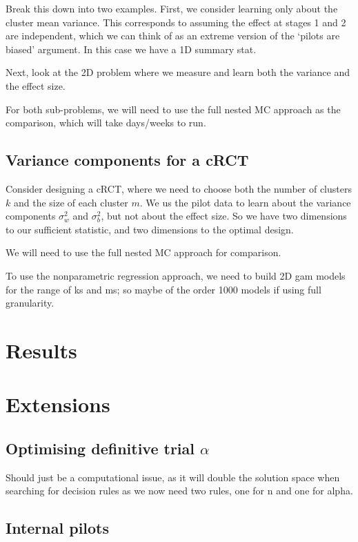 \documentclass[sagev, Crown]{sagej} %
\begin{document}
Break this down into two examples. First, we consider learning only about the cluster mean variance. This corresponds to assuming the effect at stages 1 and 2 are independent, which we can think of as an extreme version of the `pilots are biased' argument. In this case we have a 1D summary stat.

Next, look at the 2D problem where we measure and learn both the variance and the effect size.

For both sub-problems, we will need to use the full nested MC approach as the comparison, which will take days/weeks to run.

\subsection{Variance components for a cRCT}

Consider designing a cRCT, where we need to choose both the number of clusters $k$ and the size of each cluster $m$. We us the pilot data to learn about the variance components $\sigma_w^2$ and $\sigma_b^2$, but not about the effect size. So we have two dimensions to our sufficient statistic, and two dimensions to the optimal design.

We will need to use the full nested MC approach for comparison.

To use the nonparametric regression approach, we need to build 2D gam models for the range of ks and ms; so maybe of the order 1000 models if using full granularity.

\section{Results}

\section{Extensions}

\subsection{Optimising definitive trial $\alpha$}

Should just be a computational issue, as it will double the solution space when searching for decision rules as we now need two rules, one for n and one for alpha.


\subsection{Internal pilots}
\end{document}
